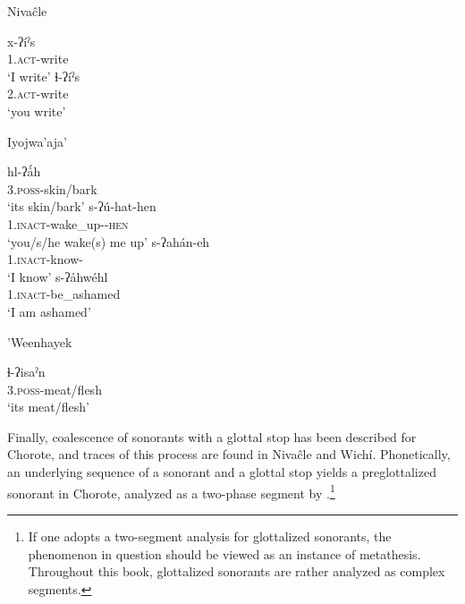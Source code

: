 \newpage
\ea\label{ex:fric-plus-glott:niv}
Nivaĉle \citep[139]{JS16}\\
\begin{xlist}
        \ex \gll x-ʔíˀs~\\
                1\SG.\textsc{act}-write\\
                \glt `I write'
        \ex \gll ɬ-ʔíˀs~\\
                2.\textsc{act}-write\\
                \glt `you write'
\end{xlist}
\z
\ea\label{ex:fric-plus-glott:ijw}
Iyojwa’aja’ \citep[78, 91]{JC14b}\\
\begin{xlist}
        \ex \gll hl-ʔǻh~\\
                3.\textsc{poss}-skin/bark\\
                \glt `its skin/bark'
        \ex \gll s-ʔú-hat-hen~\\
                1\SG.\textsc{inact}-wake\_up-\CAUS-\textsc{hen}\\
                \glt `you/s/he wake(s) me up'
        \ex \gll s-ʔahán-eh~\\
                1\SG.\textsc{inact}-know-\APPL\\
                \glt `I know'
        \ex \gll s-ʔåhwéhl~\\
                1\SG.\textsc{inact}-be\_ashamed\\
                \glt `I am ashamed'
\end{xlist}
\z
\ea\label{ex:fric-plus-glott:whk}
    ’Weenhayek \citep[96]{KC16}
    \begin{xlist}
        \ex \gll ɬ-ʔisaˀn~\\
                3.{\textsc{poss}}-meat/flesh\\
                \glt `its meat/flesh'
    \end{xlist}
\z

Finally, coalescence of sonorants with a glottal stop has been described for Chorote, and traces of this process are found in Nivaĉle and Wichí. Phonetically, an underlying sequence of a sonorant and a glottal stop yields a preglottalized sonorant in Chorote, analyzed as a two-phase segment by \citet[81]{JC14b}.\footnote{If one adopts a two-segment analysis for glottalized sonorants, the phenomenon in question should be viewed as an instance of metathesis. Throughout this book, glottalized sonorants are rather analyzed as complex segments.}

